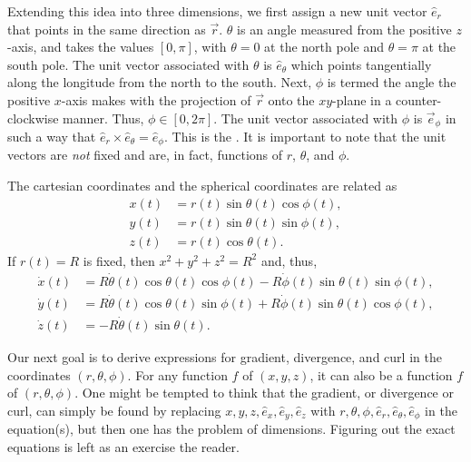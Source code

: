 Extending this idea into three dimensions, we first assign a new unit vector $\hat{e}_{r}$ that points in the same direction as $\vec{r}$. $\theta$ is an angle measured from the positive $z$-axis, and takes the values $[0,\pi]$, with $\theta = 0$ at the north pole and $\theta = \pi$ at the south pole. The unit vector associated with $\theta$ is $\hat{e}_{\theta}$ which points tangentially along the longitude from the north to the south. Next, $\phi$ is termed the angle the positive $x$-axis makes with the projection of $\vec{r}$ onto the $xy$-plane in a counter-clockwise manner. Thus, $\phi \in [0,2\pi]$. The unit vector associated with $\phi$ is $\vec{e}_{\phi}$ in such a way that $\hat{e}_{r} \times \hat{e}_{\theta} = \hat{e}_{\phi}$. This is the . It is important to note that the unit vectors are \textit{not} fixed and are, in fact, functions of $r$, $\theta$, and $\phi$.

\begin{remark}
    The cartesian coordinates and the spherical coordinates are related as
    \begin{align}
        x(t) &= r(t) \sin\theta(t) \cos\phi(t),\\
        y(t) &= r(t) \sin\theta(t) \sin\phi(t),\\
        z(t) &= r(t) \cos\theta(t).
    \end{align}
    If $r(t) = R$ is fixed, then $x^{2}+y^{2}+z^{2} = R^{2}$ and, thus,
    \begin{align}
        \dot{x}(t) &= R \dot{\theta}(t) \cos\theta(t) \cos\phi(t) - R\dot{\phi}(t) \sin\theta(t) \sin\phi(t),\\
        \dot{y}(t) &= R \dot{\theta}(t) \cos\theta(t) \sin\phi(t) + R\dot{\phi}(t) \sin\theta(t) \cos\phi(t),\\
        \dot{z}(t) &= -R\dot{\theta}(t) \sin\theta(t).
    \end{align}
\end{remark}

Our next goal is to derive expressions for gradient, divergence, and curl in the coordinates $(r,\theta,\phi)$. For any function $f$ of $(x,y,z)$, it can also be a function $f$ of $(r,\theta,\phi)$. One might be tempted to think that the gradient, or divergence or curl, can simply be found by replacing $x,y,z,\hat{e}_{x},\hat{e}_{y},\hat{e}_{z}$ with $r,\theta,\phi,\hat{e}_{r},\hat{e}_{\theta},\hat{e}_{\phi}$ in the equation(s), but then one has the problem of dimensions. Figuring out the exact equations is left as an exercise the reader.\\

